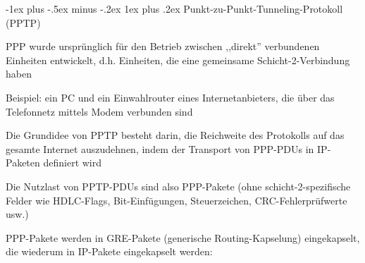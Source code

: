 \documentclass[a4paper]{article}
\makeatletter
\renewcommand{\subsubsection}{\@startsection{subsubsection}{3}{0mm}%
 {-1ex plus -.5ex minus -.2ex}%
 {1ex plus .2ex}%
 {\normalfont\small\bfseries}}
\makeatother
\begin{document}
\begin{multicols}{3}
      \subsubsection{Punkt-zu-Punkt-Tunneling-Protokoll (PPTP)}
      \begin{itemize*}
            \item PPP wurde ursprünglich für den Betrieb zwischen ,,direkt'' verbundenen Einheiten entwickelt, d.h. Einheiten, die eine gemeinsame Schicht-2-Verbindung haben
            \begin{itemize*}
                  \item Beispiel: ein PC und ein Einwahlrouter eines Internetanbieters, die über das Telefonnetz mittels Modem verbunden sind
            \end{itemize*}
            \item Die Grundidee von PPTP besteht darin, die Reichweite des Protokolls auf das gesamte Internet auszudehnen, indem der Transport von PPP-PDUs in IP-Paketen definiert wird
            \begin{itemize*}
                  \item Die Nutzlast von PPTP-PDUs sind also PPP-Pakete (ohne schicht-2-spezifische Felder wie HDLC-Flags, Bit-Einfügungen, Steuerzeichen, CRC-Fehlerprüfwerte usw.)
                  \item PPP-Pakete werden in GRE-Pakete (generische Routing-Kapselung) eingekapselt, die wiederum in IP-Pakete eingekapselt werden:
            \end{itemize*}
      \end{itemize*}



\end{multicols}
\end{document}
